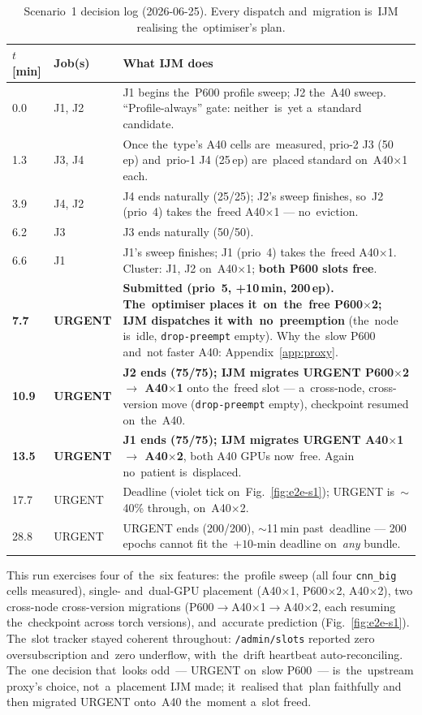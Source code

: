 \begin{table}[H]\centering\scriptsize\setlength{\tabcolsep}{4pt}
\renewcommand{\arraystretch}{1.15}%
\begin{tabular}{@{}l l p{8.4cm}@{}}\toprule
$t$ [min] & Job(s) & What IJM does \\\midrule
0.0   & J1, J2     & J1 begins the~P600 profile sweep; J2 the~A40 sweep.  ``Profile-always'' gate: neither~is~yet a~standard candidate. \\
1.3   & J3, J4     & Once the~type's A40 cells are~measured, prio-2 J3 (50\,ep) and~prio-1 J4 (25\,ep) are~placed standard on~A40$\times$1 each. \\
3.9   & J4, J2     & J4 ends naturally (25/25); J2's sweep finishes, so~J2 (prio~4) takes the~freed A40$\times$1 --- no~eviction. \\
6.2   & J3         & J3 ends naturally (50/50). \\
6.6   & J1         & J1's sweep finishes; J1 (prio~4) takes the~freed A40$\times$1.  Cluster: J1, J2 on~A40$\times$1; \textbf{both P600 slots free}. \\
\textbf{7.7} & \textbf{URGENT} & \textbf{Submitted (prio~5, +10\,min, 200\,ep).  The~optimiser places it~on~the~free P600$\times$2; IJM dispatches it with~no~preemption} (the~node is~idle, \texttt{drop-preempt} empty).  Why the~slow P600 and~not faster A40: Appendix~\ref{app:proxy}. \\
\textbf{10.9} & \textbf{URGENT} & \textbf{J2 ends (75/75); IJM migrates URGENT P600$\times$2 $\to$ A40$\times$1} onto the~freed slot --- a~cross-node, cross-version move (\texttt{drop-preempt} empty), checkpoint resumed on~the~A40. \\
\textbf{13.5} & \textbf{URGENT} & \textbf{J1 ends (75/75); IJM migrates URGENT A40$\times$1 $\to$ A40$\times$2}, both A40 GPUs now~free.  Again no~patient is~displaced. \\
17.7  & URGENT     & Deadline (violet tick on~Fig.~\ref{fig:e2e-s1}); URGENT is~$\sim$40\% through, on~A40$\times$2. \\
28.8  & URGENT     & URGENT ends (200/200), $\sim$11\,min past~deadline --- 200 epochs cannot fit the~$+10$-min deadline on~\emph{any} bundle. \\\bottomrule
\end{tabular}
\caption{Scenario~1 decision log (2026-06-25).  Every dispatch and~migration
is~IJM realising the~optimiser's plan.}\label{tab:e2e-s1-decisions}
\end{table}

This run exercises four of~the~six features: the~profile sweep (all four
\texttt{cnn\_big} cells measured), single- and~dual-GPU placement (A40$\times$1,
P600$\times$2, A40$\times$2), two cross-node cross-version migrations
(P600$\to$A40$\times$1$\to$A40$\times$2, each resuming the~checkpoint across
torch versions), and~accurate prediction (Fig.~\ref{fig:e2e-s1}).  The~slot
tracker stayed coherent throughout: \texttt{/admin/slots} reported zero
oversubscription and~zero underflow, with~the~drift heartbeat auto-reconciling.
The~one decision that~looks odd~--- URGENT on~slow P600~--- is~the~upstream
proxy's choice, not~a~placement IJM made; it~realised that~plan faithfully and
then migrated URGENT onto~A40 the~moment a~slot freed.

